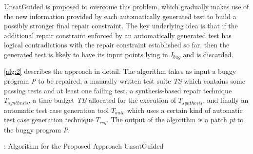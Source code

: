 UnsatGuided is proposed to overcome this problem, which gradually makes use of the new information provided by each automatically generated test to build a possibly stronger final repair constraint. 
The key underlying idea is that if the additional repair constraint enforced by an automatically generated test has logical contradictions with the repair constraint established so far, then the generated test is likely to have its input points lying in $I_{bug}$ and is discarded. 

\autoref{alg:2} describes the approach in detail. 
The algorithm takes as input a buggy program \emph{P} to be repaired, a manually written test suite \emph{TS} which contains some passing tests and at least one failing test, a synthesis-based repair technique $T_{synthesis}$, a time budget \emph{TB} allocated for the execution of $T_{synthesis}$, and finally an automatic test case generation tool $T_{auto}$ which uses a certain kind of automatic test case generation technique $T_{reg}$. 
The output of the algorithm is a patch \emph{pt} to the buggy program \emph{P}.

\begin{algorithm}[t]
	\begin{algorithmic}[1]
		\Else
			\EndFor
				\Else
				\EndIf
			\EndFor
		\EndIf
	\end{algorithmic}
	\caption{: Algorithm for the Proposed Approach UnsatGuided}
	\label{alg:2}
\end{algorithm}

